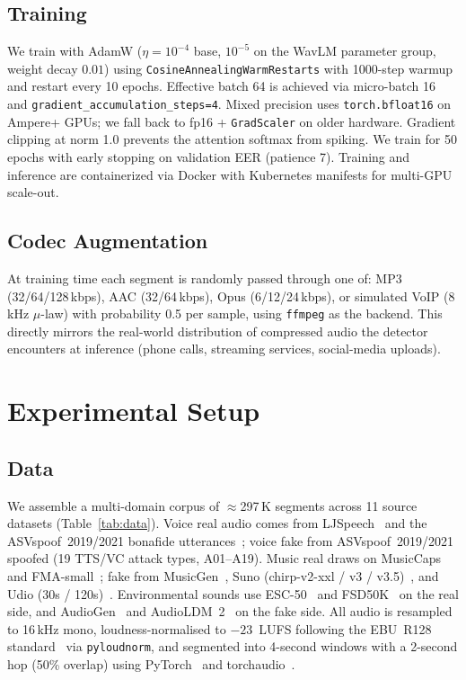 \documentclass[10pt,twocolumn,a4paper]{article}
\begin{document}
\subsection{Training}
\label{sec:training}

We train with AdamW ($\eta=10^{-4}$ base, $10^{-5}$ on the WavLM parameter group, weight decay $0.01$) using \texttt{CosineAnnealingWarmRestarts} with 1000-step warmup and restart every 10 epochs. Effective batch 64 is achieved via micro-batch 16 and \texttt{gradient\_accumulation\_steps=4}. Mixed precision uses \texttt{torch.bfloat16} on Ampere+ GPUs; we fall back to fp16 + \texttt{GradScaler} on older hardware. Gradient clipping at norm 1.0 prevents the attention softmax from spiking. We train for 50 epochs with early stopping on validation EER (patience 7). Training and inference are containerized via Docker with Kubernetes manifests for multi-GPU scale-out.

\subsection{Codec Augmentation}
\label{sec:codec}

At training time each segment is randomly passed through one of: MP3 (32/64/128\,kbps), AAC (32/64\,kbps), Opus (6/12/24\,kbps), or simulated VoIP (8\,kHz $\mu$-law) with probability 0.5 per sample, using \texttt{ffmpeg} as the backend. This directly mirrors the real-world distribution of compressed audio the detector encounters at inference (phone calls, streaming services, social-media uploads).

\section{Experimental Setup}
\label{sec:setup}

\subsection{Data}
\label{sec:data}

We assemble a multi-domain corpus of $\approx$297\,K segments across 11 source datasets (Table~\ref{tab:data}). Voice real audio comes from LJSpeech~\cite{ljspeech} and the ASVspoof~2019/2021 bonafide utterances~\cite{asvspoof2019,asvspoof2021}; voice fake from ASVspoof~2019/2021 spoofed (19 TTS/VC attack types, A01--A19). Music real draws on MusicCaps~\cite{musiccaps_2023} and FMA-small~\cite{fma_2017}; fake from MusicGen~\cite{musicgen_2023}, Suno (chirp-v2-xxl / v3 / v3.5)~\cite{suno_platform}, and Udio (30s / 120s)~\cite{udio_platform}. Environmental sounds use ESC-50~\cite{esc50_2015} and FSD50K~\cite{fsd50k_2022} on the real side, and AudioGen~\cite{audiogen_2023} and AudioLDM~2~\cite{audioldm2_2024} on the fake side. All audio is resampled to 16\,kHz mono, loudness-normalised to $-23$~LUFS following the EBU~R128 standard~\cite{ebu_r128} via \texttt{pyloudnorm}, and segmented into 4-second windows with a 2-second hop (50\% overlap) using PyTorch~\cite{pytorch} and torchaudio~\cite{torchaudio}.
\end{document}

